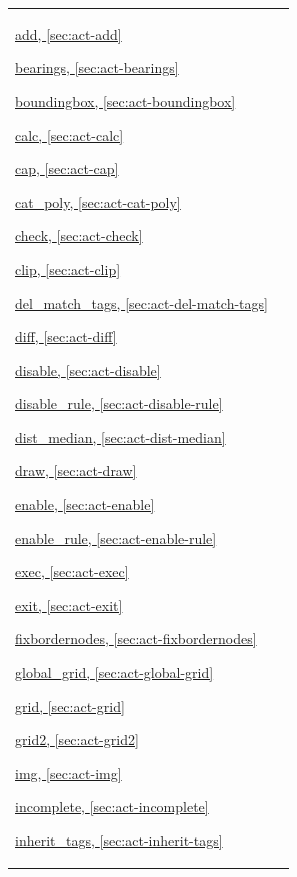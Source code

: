 \noindent\begin{tabular}{p{}p{}}
\hyperref[sec:act-add]{add, \ref*{sec:act-add}}

\hyperref[sec:act-bearings]{bearings, \ref*{sec:act-bearings}}

\hyperref[sec:act-boundingbox]{boundingbox, \ref*{sec:act-boundingbox}}

\hyperref[sec:act-calc]{calc, \ref*{sec:act-calc}}

\hyperref[sec:act-cap]{cap, \ref*{sec:act-cap}}

\hyperref[sec:act-cat-poly]{cat\_poly, \ref*{sec:act-cat-poly}}

\hyperref[sec:act-check]{check, \ref*{sec:act-check}}

\hyperref[sec:act-clip]{clip, \ref*{sec:act-clip}}

\hyperref[sec:act-del-match-tags]{del\_match\_tags, \ref*{sec:act-del-match-tags}}

\hyperref[sec:act-diff]{diff, \ref*{sec:act-diff}}

\hyperref[sec:act-disable]{disable, \ref*{sec:act-disable}}

\hyperref[sec:act-disable-rule]{disable\_rule, \ref*{sec:act-disable-rule}}

\hyperref[sec:act-dist-median]{dist\_median, \ref*{sec:act-dist-median}}

\hyperref[sec:act-draw]{draw, \ref*{sec:act-draw}}

\hyperref[sec:act-enable]{enable, \ref*{sec:act-enable}}

\hyperref[sec:act-enable-rule]{enable\_rule, \ref*{sec:act-enable-rule}}

\hyperref[sec:act-exec]{exec, \ref*{sec:act-exec}}

\hyperref[sec:act-exit]{exit, \ref*{sec:act-exit}}

\hyperref[sec:act-fixbordernodes]{fixbordernodes, \ref*{sec:act-fixbordernodes}}

\hyperref[sec:act-global-grid]{global\_grid, \ref*{sec:act-global-grid}}

\hyperref[sec:act-grid]{grid, \ref*{sec:act-grid}}

\hyperref[sec:act-grid2]{grid2, \ref*{sec:act-grid2}}

\hyperref[sec:act-img]{img, \ref*{sec:act-img}}

\hyperref[sec:act-incomplete]{incomplete, \ref*{sec:act-incomplete}}

\hyperref[sec:act-inherit-tags]{inherit\_tags, \ref*{sec:act-inherit-tags}}


\end{tabular}
